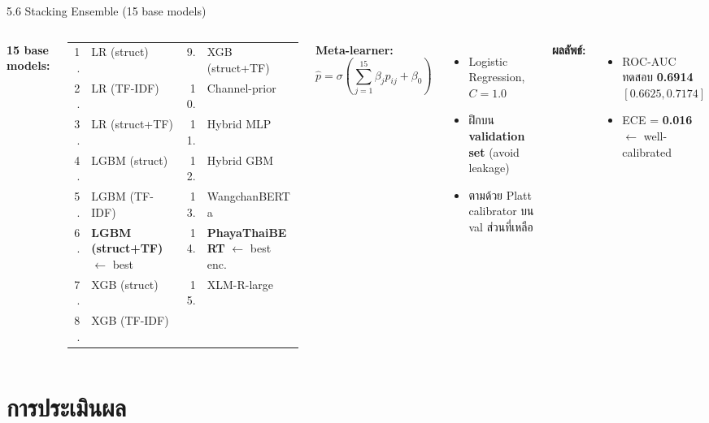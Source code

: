 \documentclass[aspectratio=169,11pt,xcolor=dvipsnames]{beamer}
\newcommand{\hl}[1]{\textcolor{kmitlOrange}{\textbf{#1}}}
\begin{document}
\begin{frame}[shrink=8]{5.6 Stacking Ensemble (15 base models)}
  \begin{columns}[T]
    \scriptsize
    \textbf{15 base models:}\\[0.2em]
    \begin{tabular}{@{}rl@{\quad}rl@{}}
      1.  & LR (struct)              & 9.  & XGB (struct+TF)\\
      2.  & LR (TF-IDF)              & 10. & Channel-prior\\
      3.  & LR (struct+TF)           & 11. & Hybrid MLP\\
      4.  & LGBM (struct)            & 12. & Hybrid GBM\\
      5.  & LGBM (TF-IDF)            & 13. & WangchanBERTa\\
      6.  & \hl{LGBM (struct+TF)} $\leftarrow$ best & 14. & \hl{PhayaThaiBERT} $\leftarrow$ best enc.\\
      7.  & XGB (struct)             & 15. & XLM-R-large\\
      8.  & XGB (TF-IDF)             &     & \\
    \end{tabular}
    \textbf{Meta-learner:}
    \[
      \hat p = \sigma\!\left(\sum_{j=1}^{15} \beta_j p_{ij} + \beta_0\right)
    \]
    \begin{itemize}
      \item Logistic Regression, $C = 1.0$
      \item ฝึกบน \hl{validation set} (avoid leakage)
      \item ตามด้วย Platt calibrator บน val ส่วนที่เหลือ
    \end{itemize}
    \vspace{0.4em}
    \textbf{ผลลัพธ์:}
    \begin{itemize}
      \item ROC-AUC ทดสอบ \hl{0.6914}\\
        $[0.6625, 0.7174]$
      \item ECE = \hl{0.016} $\leftarrow$ well-calibrated
    \end{itemize}
  \end{columns}
\end{frame}

\section{การประเมินผล}
\end{document}

